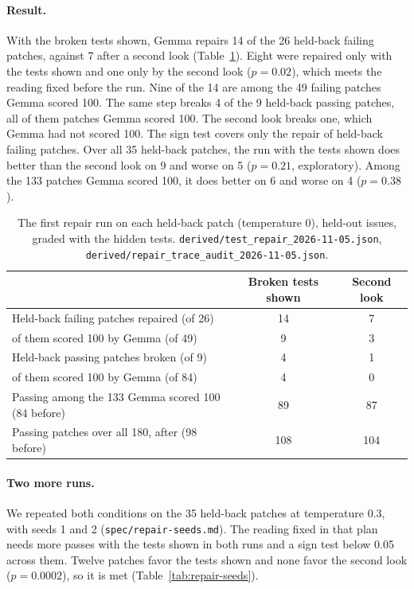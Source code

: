\documentclass[10pt,letterpaper]{article}
\begin{document}
\paragraph{Result.} With the broken tests shown, Gemma repairs 14 of the 26 held-back failing patches, against 7 after
a second look (Table~\ref{tab:repair}). Eight were repaired only with the tests shown and one only by the second look
($p = 0.02$), which meets the reading fixed before the run. Nine of the 14 are among the 49 failing patches Gemma
scored 100. The same step breaks 4 of the 9 held-back passing patches, all of them patches Gemma scored 100. The
second look breaks one, which Gemma had not scored 100. The sign test covers only the repair of held-back failing
patches. Over all 35 held-back patches, the run with the tests shown does better than the second look on 9
and worse on 5 ($p = 0.21$, exploratory). Among the 133 patches Gemma scored 100, it does better on 6 and worse on 4
($p = 0.38$).

\begin{table}[H]
\centering
\small
\caption{The first repair run on each held-back patch (temperature 0), held-out issues, graded with the hidden tests.
\texttt{derived/test\_repair\_2026-11-05.json}, \texttt{derived/repair\_trace\_audit\_2026-11-05.json}.}
\label{tab:repair}
\begin{tabular}{@{}lcc@{}}
\toprule
 & Broken tests shown & Second look \\
\midrule
Held-back failing patches repaired (of 26) & 14 & 7 \\
\quad of them scored 100 by Gemma (of 49) & 9 & 3 \\
Held-back passing patches broken (of 9) & 4 & 1 \\
\quad of them scored 100 by Gemma (of 84) & 4 & 0 \\
Passing among the 133 Gemma scored 100 (84 before) & 89 & 87 \\
Passing patches over all 180, after (98 before) & 108 & 104 \\
\bottomrule
\end{tabular}
\end{table}

\paragraph{Two more runs.} We repeated both conditions on the 35 held-back patches at temperature 0.3, with seeds 1
and 2 (\texttt{spec/repair-seeds.md}). The reading fixed in that plan needs more passes with the tests shown in both
runs and a sign test below 0.05 across them. Twelve patches favor the tests shown and none favor the second look
($p = 0.0002$), so it is met (Table~\ref{tab:repair-seeds}).
\end{document}
